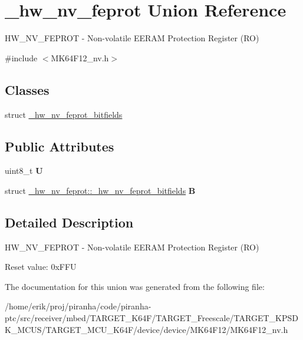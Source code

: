\hypertarget{union__hw__nv__feprot}{}\section{\+\_\+hw\+\_\+nv\+\_\+feprot Union Reference}
\label{union__hw__nv__feprot}


H\+W\+\_\+\+N\+V\+\_\+\+F\+E\+P\+R\+OT -\/ Non-\/volatile E\+E\+R\+AM Protection Register (RO)  




{\ttfamily \#include $<$M\+K64\+F12\+\_\+nv.\+h$>$}

\subsection*{Classes}
\begin{DoxyCompactItemize}
\item 
struct \hyperlink{struct__hw__nv__feprot_1_1__hw__nv__feprot__bitfields}{\+\_\+hw\+\_\+nv\+\_\+feprot\+\_\+bitfields}
\end{DoxyCompactItemize}
\subsection*{Public Attributes}
\begin{DoxyCompactItemize}
\item 
uint8\+\_\+t {\bfseries U}\hypertarget{union__hw__nv__feprot_a6baddcd3f84942c05999af3685f94b1c}{}\label{union__hw__nv__feprot_a6baddcd3f84942c05999af3685f94b1c}

\item 
struct \hyperlink{struct__hw__nv__feprot_1_1__hw__nv__feprot__bitfields}{\+\_\+hw\+\_\+nv\+\_\+feprot\+::\+\_\+hw\+\_\+nv\+\_\+feprot\+\_\+bitfields} {\bfseries B}\hypertarget{union__hw__nv__feprot_ab807a855011a1902ceccff480240a1ee}{}\label{union__hw__nv__feprot_ab807a855011a1902ceccff480240a1ee}

\end{DoxyCompactItemize}


\subsection{Detailed Description}
H\+W\+\_\+\+N\+V\+\_\+\+F\+E\+P\+R\+OT -\/ Non-\/volatile E\+E\+R\+AM Protection Register (RO) 

Reset value\+: 0x\+F\+FU 

The documentation for this union was generated from the following file\+:\begin{DoxyCompactItemize}
\item 
/home/erik/proj/piranha/code/piranha-\/ptc/src/receiver/mbed/\+T\+A\+R\+G\+E\+T\+\_\+\+K64\+F/\+T\+A\+R\+G\+E\+T\+\_\+\+Freescale/\+T\+A\+R\+G\+E\+T\+\_\+\+K\+P\+S\+D\+K\+\_\+\+M\+C\+U\+S/\+T\+A\+R\+G\+E\+T\+\_\+\+M\+C\+U\+\_\+\+K64\+F/device/device/\+M\+K64\+F12/M\+K64\+F12\+\_\+nv.\+h\end{DoxyCompactItemize}
